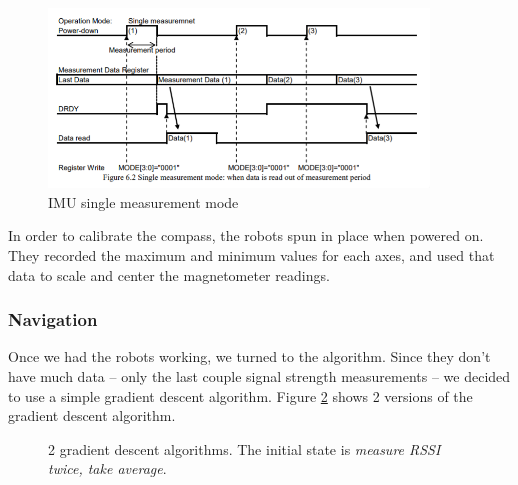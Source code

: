 \documentclass[]{article}
\begin{document}
\begin{figure}
  \centering
  \includegraphics[width=0.9\textwidth]{imu_single_measurement.png}
  \caption{IMU single measurement mode}
  \label{fig:imu_single_measurement}
\end{figure}

In order to calibrate the compass, the robots spun in place when powered
on. They recorded the maximum and minimum values for each axes, and used
that data to scale and center the magnetometer readings.

\subsubsection{Navigation}

Once we had the robots working, we turned to the algorithm.
Since they don't have much data -- only the last couple signal strength measurements --
we decided to use a simple gradient descent algorithm.
Figure \ref{fig:graddesc} shows 2 versions of the gradient descent algorithm.

\begin{figure}
  \centering
  \caption{2 gradient descent algorithms. The initial state is \emph{measure RSSI twice, take average}.}
  \label{fig:graddesc}
\end{figure}
\end{document}
